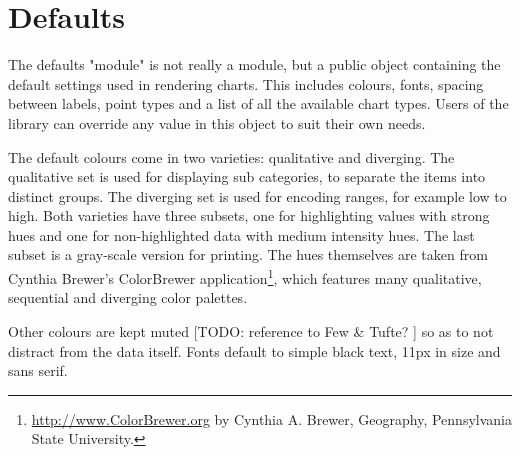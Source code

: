 \section{Defaults}
The defaults "module" is not really a module, but a public object containing the default settings used in rendering charts. This includes colours, fonts, spacing between labels, point types and a list of all the available chart types. Users of the library can override any value in this object to suit their own needs.

The default colours come in two varieties: qualitative and diverging\cite{few08}. The qualitative set is used for displaying sub categories, to separate the items into distinct groups. The diverging set is used for encoding ranges, for example low to high. Both varieties have three subsets, one for highlighting values with strong hues and one for non-highlighted data with medium intensity hues. The last subset is a gray-scale version for printing. The hues themselves are taken from Cynthia Brewer's ColorBrewer application\footnote{\url{http://www.ColorBrewer.org} by Cynthia A. Brewer, Geography, Pennsylvania State University.}, which features many qualitative, sequential and diverging color palettes.

Other colours are kept muted [TODO: reference to Few \& Tufte? ]\cite{stone06} so as to not distract from the data itself. Fonts default to simple black text, 11px in size and sans serif.




